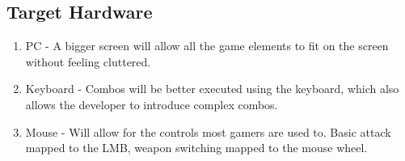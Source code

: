 \documentclass{article}
\begin{document}
\subsection*{Target Hardware}
    \begin{enumerate}
        \item PC - A bigger screen will allow all the game elements to fit on the screen without feeling cluttered. 
        \item Keyboard - Combos will be better executed using the keyboard, which also allows the developer to introduce complex combos.
        \item Mouse - Will allow for the controls most gamers are used to. Basic attack mapped to the LMB, weapon switching mapped to the mouse wheel.
    \end{enumerate}
    
\end{document}
